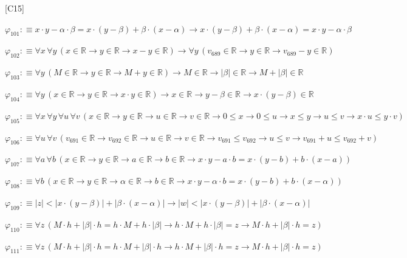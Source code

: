 \begin{fullproof}{[C15]}
\begin{abbrevlist}
\item $\varphi_{101} :\equiv x \cdot y - \alpha \cdot \beta = x \cdot (y - \beta) + \beta \cdot (x - \alpha) \to x \cdot (y - \beta) + \beta \cdot (x - \alpha) = x \cdot y - \alpha \cdot \beta$
\item $\varphi_{102} :\equiv \forall x\,\forall y\,(x \in \mathbb{R} \to y \in \mathbb{R} \to x - y \in \mathbb{R}) \to \forall y\,(v_{689} \in \mathbb{R} \to y \in \mathbb{R} \to v_{689} - y \in \mathbb{R})$
\item $\varphi_{103} :\equiv \forall y\,(M \in \mathbb{R} \to y \in \mathbb{R} \to M + y \in \mathbb{R}) \to M \in \mathbb{R} \to \lvert \beta \rvert \in \mathbb{R} \to M + \lvert \beta \rvert \in \mathbb{R}$
\item $\varphi_{104} :\equiv \forall y\,(x \in \mathbb{R} \to y \in \mathbb{R} \to x \cdot y \in \mathbb{R}) \to x \in \mathbb{R} \to y - \beta \in \mathbb{R} \to x \cdot (y - \beta) \in \mathbb{R}$
\item $\varphi_{105} :\equiv \forall x\,\forall y\,\forall u\,\forall v\,(x \in \mathbb{R} \to y \in \mathbb{R} \to u \in \mathbb{R} \to v \in \mathbb{R} \to 0 \leq x \to 0 \leq u \to x \leq y \to u \leq v \to x \cdot u \leq y \cdot v)$
\item $\varphi_{106} :\equiv \forall u\,\forall v\,(v_{691} \in \mathbb{R} \to v_{692} \in \mathbb{R} \to u \in \mathbb{R} \to v \in \mathbb{R} \to v_{691} \leq v_{692} \to u \leq v \to v_{691} + u \leq v_{692} + v)$
\item $\varphi_{107} :\equiv \forall a\,\forall b\,(x \in \mathbb{R} \to y \in \mathbb{R} \to a \in \mathbb{R} \to b \in \mathbb{R} \to x \cdot y - a \cdot b = x \cdot (y - b) + b \cdot (x - a))$
\item $\varphi_{108} :\equiv \forall b\,(x \in \mathbb{R} \to y \in \mathbb{R} \to \alpha \in \mathbb{R} \to b \in \mathbb{R} \to x \cdot y - \alpha \cdot b = x \cdot (y - b) + b \cdot (x - \alpha))$
\item $\varphi_{109} :\equiv \lvert z \rvert < \lvert x \cdot (y - \beta) \rvert + \lvert \beta \cdot (x - \alpha) \rvert \to \lvert w \rvert < \lvert x \cdot (y - \beta) \rvert + \lvert \beta \cdot (x - \alpha) \rvert$
\item $\varphi_{110} :\equiv \forall z\,(M \cdot h + \lvert \beta \rvert \cdot h = h \cdot M + h \cdot \lvert \beta \rvert \to h \cdot M + h \cdot \lvert \beta \rvert = z \to M \cdot h + \lvert \beta \rvert \cdot h = z)$
\item $\varphi_{111} :\equiv \forall z\,(M \cdot h + \lvert \beta \rvert \cdot h = h \cdot M + \lvert \beta \rvert \cdot h \to h \cdot M + \lvert \beta \rvert \cdot h = z \to M \cdot h + \lvert \beta \rvert \cdot h = z)$

\end{abbrevlist}
\end{fullproof}
